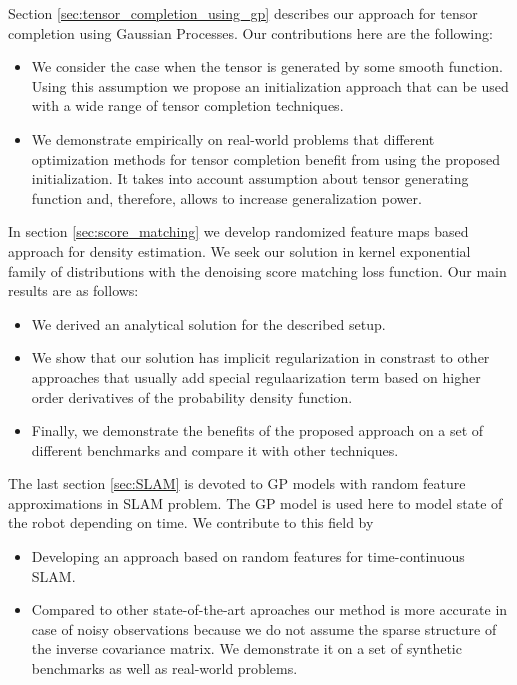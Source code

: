 Section \ref{sec:tensor_completion_using_gp} describes our approach for
tensor completion using Gaussian Processes.
Our contributions here are the following:
\begin{itemize}
    \item We consider the case when the tensor is generated by some smooth function.
    Using this assumption we propose an initialization approach that
    can be used with a wide range of tensor completion techniques.
    \item We demonstrate empirically on real-world problems that different optimization methods
    for tensor completion benefit from using the proposed initialization.
    It takes into account assumption about tensor generating function and, therefore, allows to increase generalization power.
\end{itemize}
In section \ref{sec:score_matching} we develop randomized feature maps based approach for density estimation.
We seek our solution in kernel exponential family of distributions with the denoising score matching loss function.
Our main results are as follows:
\begin{itemize}
    \item We derived an analytical solution for the described setup.
    \item We show that our solution has implicit regularization in constrast
    to other approaches that usually add special regulaarization term based on higher
    order derivatives of the probability density function.
    \item Finally, we demonstrate the benefits of the proposed approach on a set of different
    benchmarks and compare it with other techniques.
\end{itemize}
The last section \ref{sec:SLAM} is devoted to GP models with random feature approximations
in SLAM problem.
The GP model is used here to model state of the robot depending on time.
We contribute to this field by
\begin{itemize}
    \item Developing an approach based on random features for time-continuous SLAM.
    \item Compared to other state-of-the-art aproaches our method is more accurate
    in case of noisy observations because we do not assume the sparse structure of the
    inverse covariance matrix. We demonstrate it on a set of synthetic benchmarks
    as well as real-world problems.
\end{itemize}